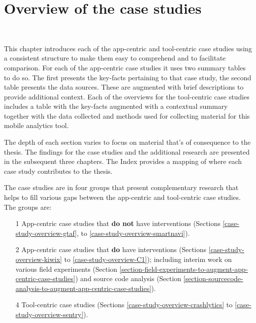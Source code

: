 \setchapterpreamble[u]{\margintoc}
\chapter{Overview of the case studies}~\label{chapter-case-studies-overview}

This chapter introduces each of the app-centric and tool-centric case studies using a consistent structure to make them easy to comprehend and to facilitate comparison. For each of the app-centric case studies it uses two summary tables to do so. The first presents the key-facts pertaining to that case study, the second table presents the data sources. These are augmented with brief descriptions to provide additional context. Each of the overviews for the tool-centric case studies includes a table with the key-facts augmented with a contextual summary together with the data collected and methods used for collecting material for this mobile analytics tool.

The depth of each section varies to focus on material that's of consequence to the thesis. The findings for the case studies and the additional research are presented in the subsequent three chapters. The Index provides a mapping of where each case study contributes to the thesis. %

The case studies are in four groups that present complementary research that helps to fill various gaps between the app-centric and tool-centric case studies. The groups are: 
\begin{enumerate}
    \itemsep0em
    \item[1] App-centric case studies that \textbf{do not} have interventions (Sections \ref{case-study-overview-gtaf}, to \ref{case-study-overview-smartnavi}).
    \item[2] App-centric case studies that \textbf{do} have interventions (Sections \ref{case-study-overview-kiwix} to \ref{case-study-overview-C1}); including interim work on various field experiments (Section \ref{section-field-experiments-to-augment-app-centric-case-studies}) and source code analysis (Section \ref{section-sourcecode-analysis-to-augment-app-centric-case-studies}).
    \item[4] Tool-centric case studies (Sections \ref{case-study-overview-crashlytics} to \ref{case-study-overview-sentry}).
\end{enumerate}


